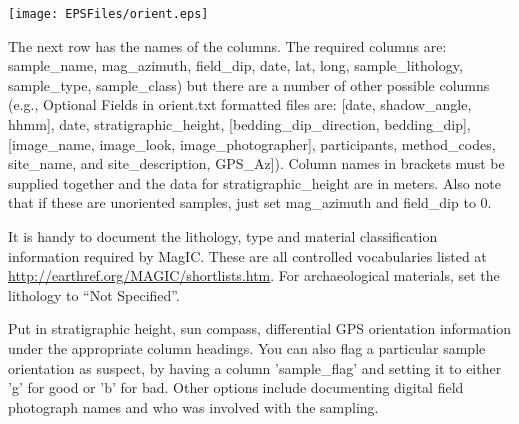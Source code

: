 \documentclass[11pt]{book}
\begin{document}
{  \texttt{[image: EPSFiles/orient.eps]}

 The next row has the names of the columns.  The required columns are:  sample\_name, mag\_azimuth, field\_dip, date, lat, long, sample\_lithology, sample\_type, sample\_class) but there are a number of other possible columns (e.g., Optional Fields in orient.txt formatted files are: [date, shadow\_angle, hhmm], date, stratigraphic\_height, [bedding\_dip\_direction, bedding\_dip], [image\_name, image\_look, image\_photographer], participants, method\_codes, site\_name, and site\_description, GPS\_Az]).  Column names in brackets must be supplied together and the data for stratigraphic\_height are in meters.  Also note that if these are unoriented samples, just set mag\_azimuth and field\_dip to 0.


   It is handy  to document the lithology, type and material classification information required by MagIC. These  are all controlled vocabularies listed at \url{http://earthref.org/MAGIC/shortlists.htm}.   For archaeological materials, set the lithology to ``Not Specified''.

   Put in stratigraphic height, sun compass, differential GPS orientation information under the appropriate column headings.  You can also flag a particular sample orientation as suspect, by having a column 'sample\_flag' and setting it to either 'g' for good or 'b' for bad.  Other options include documenting digital field photograph names and who was involved with the sampling.

}
\end{document}
